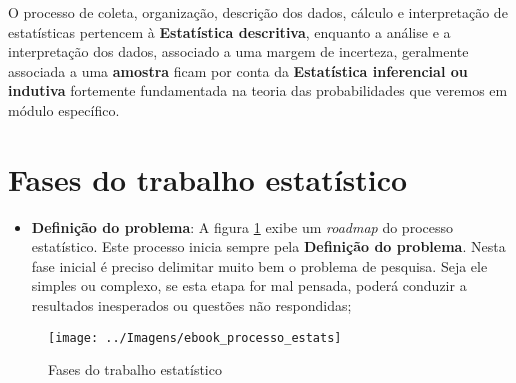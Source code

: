 \documentclass[12pt,]{style/krantz}
\providecommand{\tightlist}{%
  \setlength{\itemsep}{0pt}\setlength{\parskip}{0pt}}
\theoremstyle{definition}
\theoremstyle{definition}
\theoremstyle{definition}
\theoremstyle{remark}
\begin{document}
O processo de coleta, organização, descrição dos dados, cálculo e interpretação de estatísticas pertencem à \textbf{Estatística descritiva}, enquanto a análise e a interpretação dos dados, associado a uma margem de incerteza, geralmente associada a uma \textbf{amostra} ficam por conta da \textbf{Estatística inferencial ou indutiva} fortemente fundamentada na teoria das probabilidades que veremos em módulo específico.

\hypertarget{fases-do-trabalho-estatistico}{%
\section{Fases do trabalho estatístico}\label{fases-do-trabalho-estatistico}}

\begin{itemize}
\tightlist
\item
  \textbf{Definição do problema}: A figura \ref{fig:fig00} exibe um \emph{roadmap} do processo estatístico. Este processo inicia sempre pela \textbf{Definição do problema}. Nesta fase inicial é preciso delimitar muito bem o problema de pesquisa. Seja ele simples ou complexo, se esta etapa for mal pensada, poderá conduzir a resultados inesperados ou questões não respondidas;
\end{itemize}

\begin{figure}[H]

{\centering \texttt{[image: ../Imagens/ebook\_processo\_estats]} 

}

\caption{Fases do trabalho estatístico}\label{fig:fig00}
\end{figure}
\end{document}

